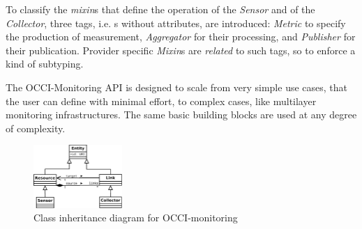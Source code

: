 \documentclass[10pt,a4paper]{article}
\begin{document}
To classify the {\em mixin}s that define the operation of the {\em Sensor} and of the {\em Collector}, three tags, i.e. \mi s without attributes, are introduced: {\em Metric} to specify the production of measurement, {\em Aggregator} for their processing, and {\em Publisher} for their publication. Provider specific {\em Mixin}s are {\em related} to such tags, so to enforce a kind of subtyping. 



The OCCI-Monitoring API is designed to scale from very simple use cases, that the user can define with minimal effort, to complex cases, like multilayer monitoring infrastructures. The same basic building blocks are used at any degree of complexity.



\begin{figure}
\centering
\includegraphics[width=0.3\textwidth]{figs/Monitoring_UML.pdf}
\caption{Class inheritance diagram for OCCI-monitoring}
\end{figure}
\end{document}
